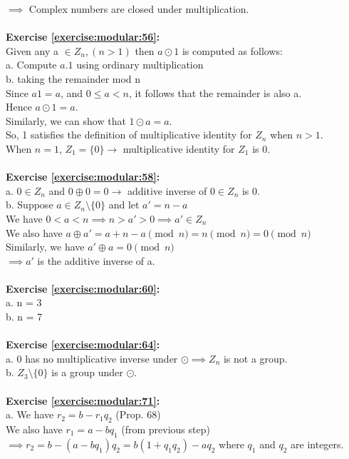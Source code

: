 $\implies$  Complex numbers are closed under multiplication.\\
\\
\textbf{Exercise \ref{exercise:modular:56}:}\\
Given any a $\in Z_n, (n>1)$ then $a \odot 1$ is computed as follows:\\
a. Compute $a.1$ using ordinary multiplication\\
b. taking the remainder mod n \\
Since $a1=a$, and $0 \le a <n$, it follows that the remainder is also a.\\
Hence $a \odot 1=a$.\\
Similarly, we can show that $1 \odot a=a$.\\
So, 1 satisfies the definition of multiplicative identity for $Z_n$ when $n>1$.\\
When $n=1$, $Z_1=\{0\} \to$ multiplicative identity for $Z_1$ is 0.\\
\\
\textbf{Exercise \ref{exercise:modular:58}:}\\
a. $0 \in Z_n$ and $0 \oplus 0=0 \to$ additive inverse of $0 \in Z_n$ is 0.\\
b. Suppose $a \in Z_n \setminus \{0\}$ and let $a'=n-a$\\
We have $0<a<n \implies n>a'>0 \implies a' \in Z_n$\\
We also have $a \oplus a'=a+n-a \pmod{n}=n \pmod{n}=0 \pmod{n}$\\
Similarly, we have $a' \oplus a=0 \pmod{n}$\\
$\implies a'$ is the additive inverse of a.\\
\\
\textbf{Exercise \ref{exercise:modular:60}:}\\
a. n = 3\\
b. n = 7\\
\\
\textbf{Exercise \ref{exercise:modular:64}:}\\
a. 0 has no multiplicative inverse under $\odot \implies Z_n$ is not a group.\\
b. $Z_3 \setminus \{0\}$ is a group under $\odot$.\\
\\
\textbf{Exercise \ref{exercise:modular:71}:}\\
a. We have $r_2=b-r_1q_2$ (Prop. 68)\\
We also have $r_1=a-bq_1$ (from previous step)\\
$\implies r_2=b-(a-bq_1)q_2=b(1+q_1q_2)-aq_2$ where $q_1$ and $q_2$ are integers.\\
